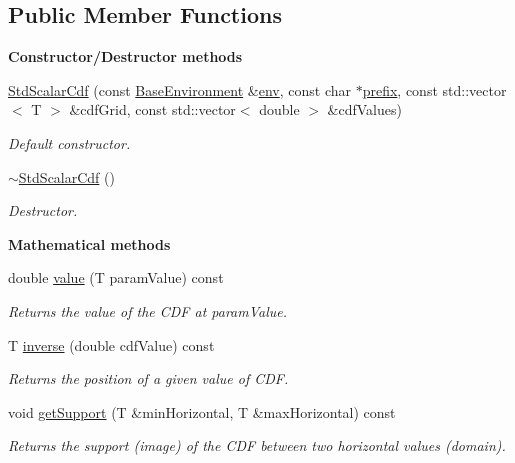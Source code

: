 \subsection*{Public Member Functions}
\begin{Indent}{\bf Constructor/\-Destructor methods}\par
\begin{DoxyCompactItemize}
\item 
\hyperlink{class_q_u_e_s_o_1_1_std_scalar_cdf_a23bae93733ff0dc82fc51754044e7c17}{Std\-Scalar\-Cdf} (const \hyperlink{class_q_u_e_s_o_1_1_base_environment}{Base\-Environment} \&\hyperlink{class_q_u_e_s_o_1_1_base_scalar_cdf_a70c89dd2ad294be170338a283fc58ff3}{env}, const char $\ast$\hyperlink{class_q_u_e_s_o_1_1_base_scalar_cdf_aafb3eaf3bf1d7269073e9c77bd8c766d}{prefix}, const std\-::vector$<$ T $>$ \&cdf\-Grid, const std\-::vector$<$ double $>$ \&cdf\-Values)
\begin{DoxyCompactList}\small\item\em Default constructor. \end{DoxyCompactList}\item 
\hyperlink{class_q_u_e_s_o_1_1_std_scalar_cdf_a24cf6c93886182c8e46e108aa65e7f4f}{$\sim$\-Std\-Scalar\-Cdf} ()
\begin{DoxyCompactList}\small\item\em Destructor. \end{DoxyCompactList}\end{DoxyCompactItemize}
\end{Indent}
\begin{Indent}{\bf Mathematical methods}\par
\begin{DoxyCompactItemize}
\item 
double \hyperlink{class_q_u_e_s_o_1_1_std_scalar_cdf_a03b075f858fa2a5d35515cf602283985}{value} (T param\-Value) const 
\begin{DoxyCompactList}\small\item\em Returns the value of the C\-D\-F at {\ttfamily param\-Value}. \end{DoxyCompactList}\item 
T \hyperlink{class_q_u_e_s_o_1_1_std_scalar_cdf_a0b989e6ac45b22f22951389ae4c41861}{inverse} (double cdf\-Value) const 
\begin{DoxyCompactList}\small\item\em Returns the position of a given value of C\-D\-F. \end{DoxyCompactList}\item 
void \hyperlink{class_q_u_e_s_o_1_1_std_scalar_cdf_ad754f420fbfaa309d6574a0c2674f06e}{get\-Support} (T \&min\-Horizontal, T \&max\-Horizontal) const 
\begin{DoxyCompactList}\small\item\em Returns the support (image) of the C\-D\-F between two horizontal values (domain). \end{DoxyCompactList}\end{DoxyCompactItemize}
\end{Indent}
